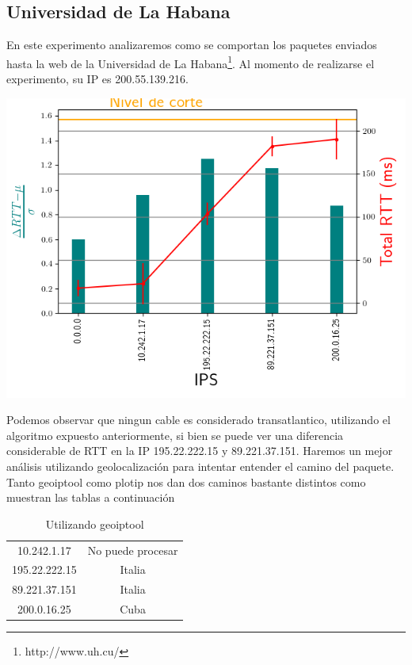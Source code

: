 \subsection{Universidad de La Habana}

En este experimento analizaremos como se comportan los paquetes enviados hasta la web de la Universidad de La Habana\footnote{http://www.uh.cu/}. Al momento de realizarse el experimento, su IP es 200.55.139.216.

 \includegraphics[scale=0.8]{imagenes/rtts_habana.png}

Podemos observar que ningun cable es considerado transatlantico, utilizando el algoritmo expuesto anteriormente, si bien se puede ver una diferencia considerable de RTT en la IP 195.22.222.15 y 89.221.37.151. Haremos un mejor an\'alisis utilizando geolocalizaci\'on para intentar entender el camino del paquete.\\

Tanto geoiptool como plotip nos dan dos caminos bastante distintos como muestran las tablas a continuaci\'on
 
\begin{table}
\centering
\begin{tabular}{|c|c|}
10.242.1.17 & No puede procesar \\
195.22.222.15 & Italia  \\
89.221.37.151 & Italia \\
200.0.16.25 & Cuba \\
\end{tabular}
\caption{Utilizando geoiptool}
\end{table}

